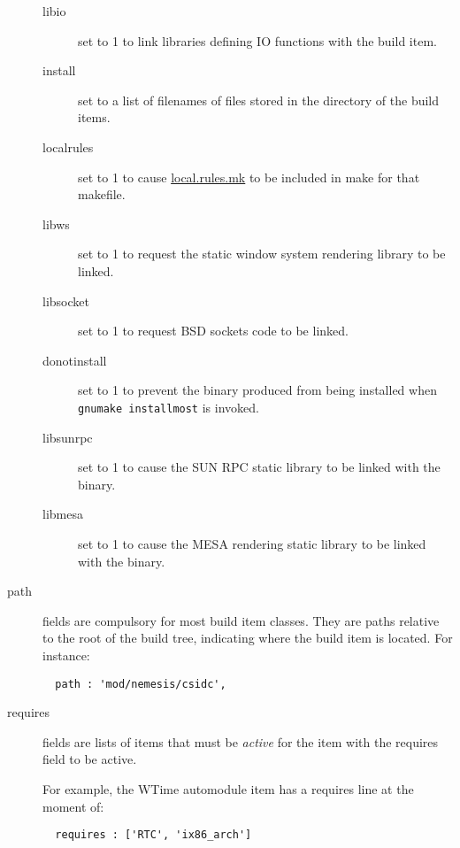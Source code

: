 \documentclass[a4paper]{article}
\newcommand{\cmd}[1]{\texttt{#1}}
\begin{document}
\begin{description}
\begin{description}
\item[libio] set to 1 to link libraries defining IO functions with the
build item.

\item[install] set to a list of filenames of files stored in the
directory of the build items. 

\item[localrules] set to 1 to cause \url{local.rules.mk} to be
included in make for that makefile.

\item[libws] set to 1 to request the static window system rendering
library to be linked.

\item[libsocket] set to 1 to request BSD sockets code to be linked.

\item[donotinstall] set to 1 to prevent the binary produced from being
installed when \cmd{gnumake installmost} is invoked.

\item[libsunrpc] set to 1 to cause the SUN RPC static library to be
linked with the binary.

\item[libmesa] set to 1 to cause the MESA rendering static library to
be linked with the binary.

\end{description}


\item[path] fields are compulsory for most build item classes. They
are paths relative to the root of the build tree, indicating where the
build item is located. For instance:

\begin{verbatim}
  path : 'mod/nemesis/csidc',
\end{verbatim}


\item[requires] fields are lists of items that must be \emph{active}
for the item with the requires field to be active. 

For example, the WTime automodule item has a requires line at the
  moment of:
\begin{verbatim}
  requires : ['RTC', 'ix86_arch']
\end{verbatim}


\end{description}
\end{document}
